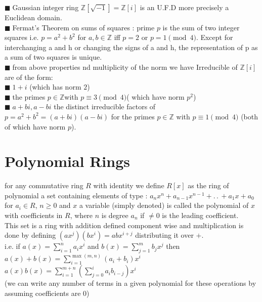 \documentclass[11pt]{extarticle}
\newcommand{\Z}{\mathbb{Z}}
\newcommand{\ck}{.\,.\,}
\newcommand{\snote}[1]{{\footnotesize(#1)}}
\newcommand{\tbx}[2][]{
	\begin{tcolorbox}[enhanced,breakable,size=small,colback=black!2!white,title={#1},arc is angular, arc=1.5mm,drop fuzzy shadow]
		#2
	\end{tcolorbox}
}
\newcommand{\y}{$\blacksquare\;$}
\begin{document}
\begin{multicols}{2}
{ }
\tbx[Gaussian integer ring]{
	\y Gaussian integer ring $ \Z[\sqrt{-1}]=\Z[i] $ is an U.F.D more precisely a Euclidean domain.\\
\y  Fermat's Theorem on sums of squares :  prime $p $ is the sum of two integer
squares i.e. $ p = a^2 + b^2$ for $ a,b \in \Z$ iff $p = 2 $ or $p = 1 \pmod4$. Except
for interchanging a and h or changing the signs of a and h, the representation
of p as a sum of two squares is unique.\\
\y from above properties nd multiplicity of the norm we have Irreducible of $ \Z[i] $ are of the form:\\
\y $1 + i $ (which has norm $2$)\\
\y the primes $p \in  \Z $with $p \equiv 3 \pmod 4 $\snote{ which have norm $p^2 $}\\
\y  $a +bi , a-bi $ the distinct irreducible factors of $p = a^2 + b^2 =
(a + bi) (a - bi ) $ for the primes $p \in \Z $ with $p \equiv 1 \pmod 4 $ \snote{both of which
have norm $p $}.}
\newcolumn
		\section{Polynomial Rings} 

\tbx{for any commutative ring $ R $ with identity we define $ R[x] $ as the ring of polynomial a set containing elements of type :
			$ a_nx^n+a_{n-1}x^{n-1}+\ck +a_1x+a_0 $ for $ a_i\in R $, $ n\geq 0 $ and $ x $ a variable \snote{simply denoted} is called the polynomial of $ x $ with coefficients in $ R $, where  $ n $ is degree $ a_n $ if $ \neq 0 $ is the leading coefficient.\\
			This set is a ring with addition defined component wise and multiplication is done by defining 
			$ (ax^j)(bx^i)=abx^{i+j} $ distributing it over $ + $. \\
			i.e. if $ a(x)=\sum_{i=1}^{n}a_i x^i$ and $ b(x)=\sum_{j=1}^{m} b_j x^j$ then
			$ a(x)+b(x)=\sum_{i=1}^{\max(m,n)}(a_i+b_i)x^i $
			$ a(x)b(x)= \sum_{i=1}^{m+n}(\sum_{j=0}^{i}a_ib_{i-j})x^i$\\
			\snote{we can write any number of terms in a given polynomial for these operations by assuming coefficients are 0}
			} 
		

\end{multicols}
\end{document}
